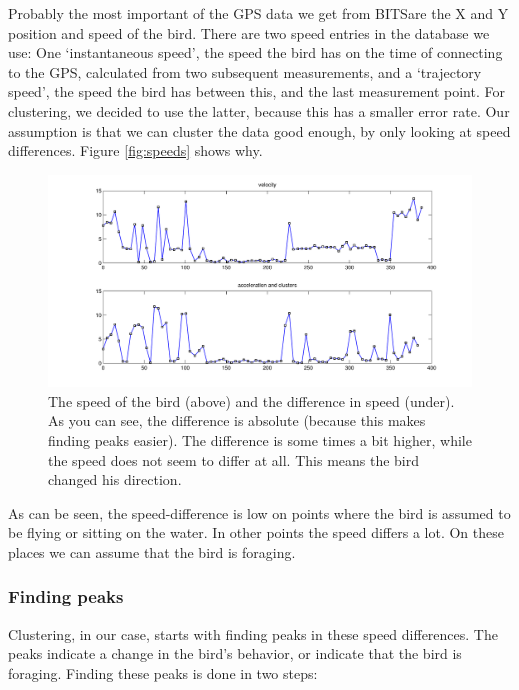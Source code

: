 \documentclass[a4paper,10pt]{article}
\newcommand{\bits}{BITS}
\begin{document}
 Probably the most important of the GPS data we get from \bits are the X and Y
 position and speed of the bird. There are two speed entries in the database we
 use: One `instantaneous speed', the speed the bird has on the time of
 connecting to the GPS, calculated from two subsequent measurements, and a
 `trajectory speed', the speed the bird has between this, and the last
 measurement point. For clustering, we decided to use the latter, because this
 has a smaller error rate. Our assumption is that we can cluster the data good
 enough, by only looking at speed differences. Figure \ref{fig:speeds} shows
 why.
\begin{figure}
\centering
\includegraphics[width=.8\textwidth]{speed.pdf}
\caption{The speed of the bird (above) and the difference in speed (under). As
you can see, the difference is absolute (because this makes finding peaks
easier). The difference is some times a bit higher, while the speed does not
seem to differ at all. This means the bird changed his direction.}
\label{fig:storyboard}
\end{figure}

 As can be seen, the speed-difference is low on points where the bird is assumed
 to be flying or sitting on the water. In other points the speed differs a lot.
 On these places we can assume that the bird is foraging.

 \subsubsection{Finding peaks}
 Clustering, in our case, starts with finding peaks in these speed differences.
 The peaks indicate a change in the bird's behavior, or indicate that the bird
 is foraging. Finding these peaks is done in two steps:
\end{document}
